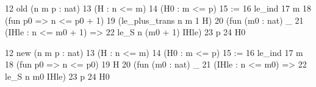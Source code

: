 12  old (n m p : nat)
13    (H : n <= m) 
14    (H0 : m <= p)
15  :=
16    le_ind
17      m
18      (fun p0 => n <= p0 + 1)
19      (le_plus_trans n m 1 H)
20      (fun (m0 : nat) _
21        (IHle : n <= m0 + 1) =>
22          le_S n (m0 + 1) IHle)
23      p
24      H0

12  new (n m p : nat)
13    (H : n <= m) 
14    (H0 : m <= p)
15  :=
16    le_ind
17      m
18      (fun p0 => n <= p0)
19      H
20      (fun (m0 : nat) _ 
21        (IHle : n <= m0) =>
22          le_S n m0 IHle)
23      p
24      H0
